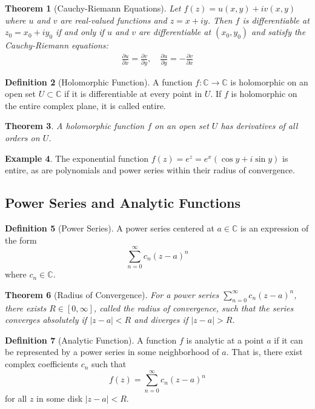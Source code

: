 \documentclass[12pt,a4paper]{article}
\theoremstyle{plain}
\newtheorem{theorem}{Theorem}[section]
\theoremstyle{definition}
\newtheorem{definition}[theorem]{Definition}
\newtheorem{example}[theorem]{Example}
\begin{document}
\begin{theorem}[Cauchy-Riemann Equations]
Let $f(z) = u(x,y) + iv(x,y)$ where $u$ and $v$ are real-valued functions and $z = x + iy$. Then $f$ is differentiable at $z_0 = x_0 + iy_0$ if and only if $u$ and $v$ are differentiable at $(x_0, y_0)$ and satisfy the Cauchy-Riemann equations:
\begin{align}
\frac{\partial u}{\partial x} = \frac{\partial v}{\partial y}, \quad \frac{\partial u}{\partial y} = -\frac{\partial v}{\partial x}
\end{align}
\end{theorem}

\begin{definition}[Holomorphic Function]
A function $f: \mathbb{C} \to \mathbb{C}$ is holomorphic on an open set $U \subset \mathbb{C}$ if it is differentiable at every point in $U$. If $f$ is holomorphic on the entire complex plane, it is called entire.
\end{definition}

\begin{theorem}
A holomorphic function $f$ on an open set $U$ has derivatives of all orders on $U$.
\end{theorem}

\begin{example}
The exponential function $f(z) = e^z = e^x(\cos y + i\sin y)$ is entire, as are polynomials and power series within their radius of convergence.
\end{example}

\subsection{Power Series and Analytic Functions}

\begin{definition}[Power Series]
A power series centered at $a \in \mathbb{C}$ is an expression of the form
\[\sum_{n=0}^{\infty} c_n (z-a)^n\]
where $c_n \in \mathbb{C}$.
\end{definition}

\begin{theorem}[Radius of Convergence]
For a power series $\sum_{n=0}^{\infty} c_n (z-a)^n$, there exists $R \in [0, \infty]$, called the radius of convergence, such that the series converges absolutely if $|z-a| < R$ and diverges if $|z-a| > R$.
\end{theorem}

\begin{definition}[Analytic Function]
A function $f$ is analytic at a point $a$ if it can be represented by a power series in some neighborhood of $a$. That is, there exist complex coefficients $c_n$ such that
\[f(z) = \sum_{n=0}^{\infty} c_n (z-a)^n\]
for all $z$ in some disk $|z-a| < R$.
\end{definition}
\end{document}

